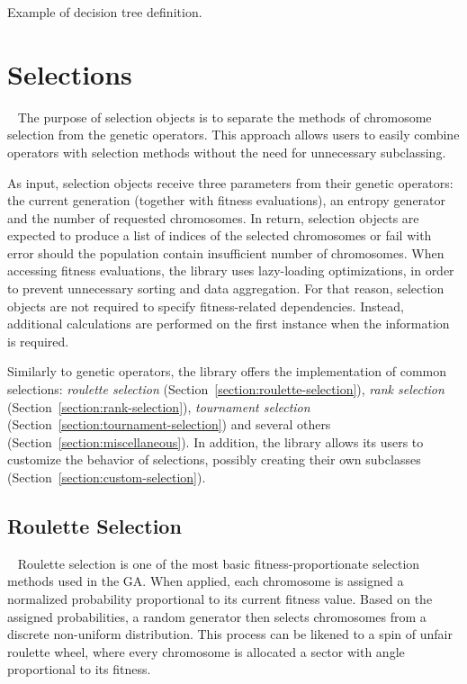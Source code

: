 \begin{listing}[ht]
	\caption{Example of decision tree definition.}
	\label{listing:decision-tree-definition}
\end{listing}

\section{Selections}~\label{section:selection}
The purpose of selection objects is to separate the methods of chromosome selection from the genetic operators. This approach allows users to easily combine operators with selection methods without the need for unnecessary subclassing.

As input, selection objects receive three parameters from their genetic operators: the current generation (together with fitness evaluations), an entropy generator and the number of requested chromosomes. In return, selection objects are expected to produce a list of indices of the selected chromosomes or fail with error should the population contain insufficient number of chromosomes. When accessing fitness evaluations, the library uses lazy-loading optimizations, in order to prevent unnecessary sorting and data aggregation. For that reason, selection objects are not required to specify fitness-related dependencies. Instead, additional calculations are performed on the first instance when the information is required.

Similarly to genetic operators, the library offers the implementation of common selections: \textit{roulette selection} (Section~\ref{section:roulette-selection}), \textit{rank selection} (Section~\ref{section:rank-selection}), \textit{tournament selection} (Section~\ref{section:tournament-selection}) and several others (Section~\ref{section:miscellaneous}). In addition, the library allows its users to customize the behavior of selections, possibly creating their own subclasses (Section~\ref{section:custom-selection}).

\subsection{Roulette Selection}~\label{section:roulette-selection}
Roulette selection is one of the most basic fitness-proportionate selection methods used in the GA. When applied, each chromosome is assigned a normalized probability proportional to its current fitness value. Based on the assigned probabilities, a random generator then selects chromosomes from a discrete non-uniform distribution. This process can be likened to a spin of unfair roulette wheel, where every chromosome is allocated a sector with angle proportional to its fitness. \cite{GaConceptsDesigns}

